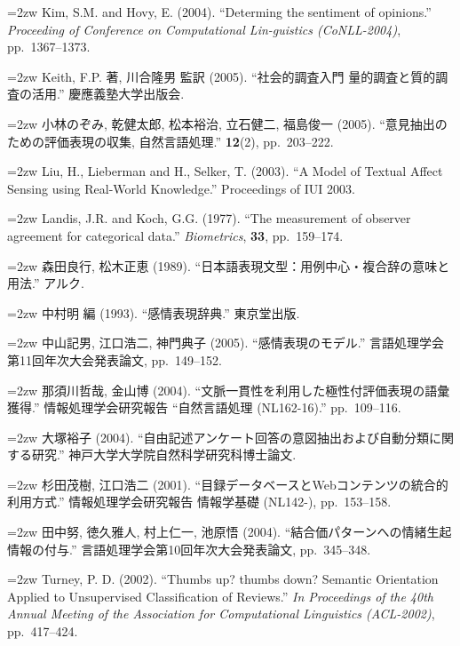 \documentclass[japanese]{jnlp_1.3a}
\begin{document}
\noindent{}\hangindent=2zw
Kim, S.M. and Hovy, E. (2004). ``Determing the sentiment of opinions.'' 
\textit{Proceeding of Conference on Computational Lin-guistics (CoNLL-2004)}, pp.~1367--1373.

\noindent{}\hangindent=2zw
Keith, F.P. 著, 川合隆男 監訳 (2005). ``社会的調査入門 
量的調査と質的調査の活用.'' 慶應義塾大学出版会.

\noindent{}\hangindent=2zw
小林のぞみ, 乾健太郎, 松本裕治, 立石健二, 福島俊一 (2005). 
``意見抽出のための評価表現の収集, 自然言語処理.'' \textbf{12}(2), 
pp.~203--222.

\noindent{}\hangindent=2zw
Liu, H., Lieberman and H., Selker, T. (2003). ``A Model of Textual Affect 
Sensing using Real-World Knowledge.'' Proceedings of IUI 2003.

\noindent{}\hangindent=2zw
Landis, J.R. and Koch, G.G. (1977). ``The measurement of observer agreement 
for categorical data.'' \textit{Biometrics}, \textbf{33}, pp.~159--174.

\noindent{}\hangindent=2zw
森田良行, 松木正恵 (1989). ``日本語表現文型：用例中心・複合辞の意味と用法.'' 
アルク.

\noindent{}\hangindent=2zw
中村明 編 (1993). ``感情表現辞典.'' 東京堂出版.

\noindent{}\hangindent=2zw
中山記男, 江口浩二, 神門典子 (2005). ``感情表現のモデル.'' 言語処理学会第11回年次大会発表論文, pp.~149--152.

\noindent{}\hangindent=2zw
那須川哲哉, 金山博 (2004). ``文脈一貫性を利用した極性付評価表現の語彙獲得.'' 
情報処理学会研究報告 ``自然言語処理 (NL162-16).'' pp.~109--116.

\noindent{}\hangindent=2zw
大塚裕子 (2004). 
``自由記述アンケート回答の意図抽出および自動分類に関する研究.'' 
神戸大学大学院自然科学研究科博士論文.

\noindent{}\hangindent=2zw
杉田茂樹, 江口浩二 (2001). 
``目録データベースとWebコンテンツの統合的利用方式.'' 
情報処理学会研究報告 情報学基礎 (NL142-), pp.~153--158.

\noindent{}\hangindent=2zw
田中努, 徳久雅人, 村上仁一, 池原悟 (2004). 
``結合価パターンへの情緒生起情報の付与.'' 
言語処理学会第10回年次大会発表論文, pp.~345--348.

\noindent{}\hangindent=2zw
Turney, P. D. (2002). ``Thumbs up? thumbs down? Semantic Orientation Applied 
to Unsupervised Classification of Reviews.'' \textit{In Proceedings of the 40th Annual Meeting of the Association for Computational Linguistics (ACL-2002)}, pp.~417--424.
\end{document}
